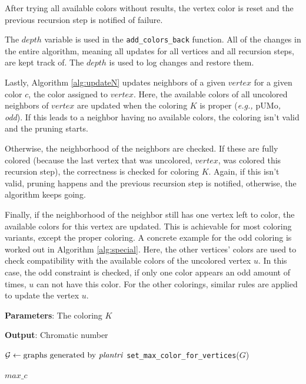 \documentclass{article}
\begin{document}
After trying all available colors without results, the vertex color is reset and the previous recursion step is notified of failure.

The $depth$ variable is used in the \texttt{add\_colors\_back} function. All of the changes in the entire algorithm, meaning all updates for all vertices and all recursion steps, are kept track of. The $depth$ is used to log changes and restore them.

Lastly, Algorithm \ref{alg:updateN} updates neighbors of a given $vertex$ for a given color $c$, the color assigned to $vertex$. Here, the available colors of all uncolored neighbors of $vertex$ are updated when the coloring $K$ is proper (\textit{e.g., $\mathrm{pUMo}$, odd}). If this leads to a neighbor having no available colors, the coloring isn't valid and the pruning starts.

Otherwise, the neighborhood of the neighbors are checked. If these are fully colored (because the last vertex that was uncolored, $vertex$, was colored this recursion step), the correctness is checked for coloring $K$. Again, if this isn't valid, pruning happens and the previous recursion step is notified, otherwise, the algorithm keeps going. 

Finally, if the neighborhood of the neighbor still has one vertex left to color, the available colors for this vertex are updated. This is achievable for most coloring variants, except the proper coloring. A concrete example for the odd coloring is worked out in Algorithm \ref{alg:special}. Here, the other vertices' colors are used to check compatibility with the available colors of the uncolored vertex $u$. In this case, the odd constraint is checked, if only one color appears an odd amount of times, $u$ can not have this color.
For the other colorings, similar rules are applied to update the vertex $u$.

\begin{algorithm}[tb]
	\caption{\texttt{search\_chromatic\_number}}
	\label{alg:search}
	\textbf{Parameters}: The coloring $K$
	
	\textbf{Output}: Chromatic number
	\begin{algorithmic}[1]
		\STATE $\mathcal{G} \gets \text{graphs generated by \textit{plantri}}$
		\STATE \texttt{set\_max\_color\_for\_vertices}($G$)
		
		\RETURN $max\_c$
		\ENDIF
		\ENDFOR
		\ENDFOR
	\end{algorithmic}
\end{algorithm}
\end{document}
